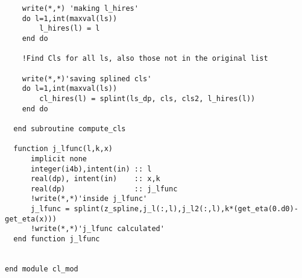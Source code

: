 \documentclass[a4paper]{report}
\begin{document}
\begin{verbatim}
    write(*,*) 'making l_hires'
    do l=1,int(maxval(ls))
        l_hires(l) = l
    end do

    !Find Cls for all ls, also those not in the original list

    write(*,*)'saving splined cls'
    do l=1,int(maxval(ls))
        cl_hires(l) = splint(ls_dp, cls, cls2, l_hires(l))
    end do

  end subroutine compute_cls
  
  function j_lfunc(l,k,x)
      implicit none
      integer(i4b),intent(in) :: l
      real(dp), intent(in)    :: x,k
      real(dp)                :: j_lfunc
      !write(*,*)'inside j_lfunc'
      j_lfunc = splint(z_spline,j_l(:,l),j_l2(:,l),k*(get_eta(0.d0)-get_eta(x)))
      !write(*,*)'j_lfunc calculated'
  end function j_lfunc


end module cl_mod
\end{verbatim}
\newpage
\end{document}
